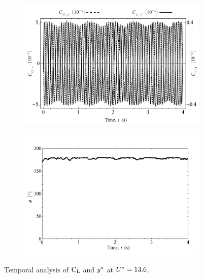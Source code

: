 \documentclass[oneside]{utmthesis}
\begin{document}
\begin{figure}
  \centering
  \begin{subfigure}[h]{1\textwidth}
    \includegraphics[width=\textwidth]{figs/tempAnalysisLower-a}
    \caption{}
    \label{fig:tempAnalysisLower-a}
  \end{subfigure}

  \begin{subfigure}[h]{1\textwidth}
    \includegraphics[width=\textwidth]{figs/tempAnalysisLower-b}
    \caption{}
    \label{fig:tempAnalysisLower-b}
  \end{subfigure}
  \caption{Temporal analysis of $\text{C}_{\text{L}}$ and $y^{*}$ at $U^{*} = 13.6$.}
\end{figure}
\end{document}
